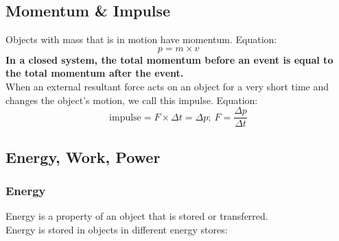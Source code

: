 \documentclass[a4paper,12pt]{article}
\begin{document}
\subsection{Momentum \& Impulse}
Objects with mass that is in motion have momentum. Equation:
\[p=m\times v\]
\textbf{In a closed system, the total momentum before an event is equal to the total momentum after the event.}\\
When an external resultant force acts on an object for a very short time and changes the object's motion, we call this impulse. Equation:
\[\text{impulse}=F\times \Delta t=\Delta p;\ F=\frac{\Delta p}{\Delta t}\]
\subsection{Energy, Work, Power}
\subsubsection{Energy}
Energy is a property of an object that is stored or transferred. \\Energy is stored in objects in different energy stores:
\end{document}
